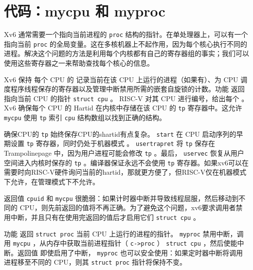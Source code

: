 \documentclass[UTF8]{article}
\begin{document}
    \section{代码：mycpu 和 myproc  }     

Xv6 通常需要一个指向当前进程的    \lstinline{proc}    结构的指针。在单处理器上，可以有一个指向当前    \lstinline{proc}    的全局变量。这在多核机器上不起作用，因为每个核心执行不同的进程。解决这个问题的方法是利用每个内核都有自己的寄存器组的事实；我们可以使用这些寄存器之一来帮助查找每个核心的信息。  

Xv6 保持
 每个 CPU 的       
        记录当前在该 CPU 上运行的进程（如果有）、为 CPU 调度程序线程保存的寄存器以及管理中断禁用所需的嵌套自旋锁的计数。功能
        返回指向当前 CPU 的指针
    \lstinline{struct cpu}    。 RISC-V 对其 CPU 进行编号，给出每个        。 Xv6 确保每个 CPU 的 Hartid 在内核中存储在该 CPU 的    \lstinline{tp}    寄存器中。这允许
    \lstinline{mycpu}    使用    \lstinline{tp}    索引    \lstinline{cpu}    结构数组以找到正确的结构。  

确保CPU的   \lstinline{tp}   始终保存CPU的shartid有点复杂。    \lstinline{start}    在 CPU 启动序列的早期设置    \lstinline{tp}    寄存器，同时仍处于机器模式
        。
    \lstinline{usertrapret}    将    \lstinline{tp}    保存在 Trampolinepage 中，因为用户进程可能会修改    \lstinline{tp}    。最后，   \lstinline{uservec}    恢复从用户空间进入内核时保存的    \lstinline{tp}   
        。编译器保证永远不会使用    \lstinline{tp}    寄存器。如果xv6可以在需要时向RISC-V硬件询问当前的hartid，那就更方便了，但RISC-V仅在机器模式下允许，在管理模式下不允许。  

返回值
    \lstinline{cpuid}    和
    \lstinline{mycpu}    很脆弱：如果计时器中断并导致线程屈服，然后移动到不同的 CPU，则先前返回的值将不再正确。为了避免这个问题，xv6要求调用者禁用中断，并且只有在使用完返回的值后才启用它们
    \lstinline{struct cpu}    。  

功能
        返回
    \lstinline{struct proc}    当前 CPU 上运行的进程的指针。
    \lstinline{myproc}    禁用中断，调用
    \lstinline{mycpu}   ，从内存中获取当前进程指针（   \lstinline{c->proc}   ）
    \lstinline{struct cpu}   ，然后使能中断。返回值
 即使启用了中断，   \lstinline{myproc}    也可以安全使用：如果定时器中断将调用进程移至不同的 CPU，则其
    \lstinline{struct proc}    指针将保持不变。
\end{document}
